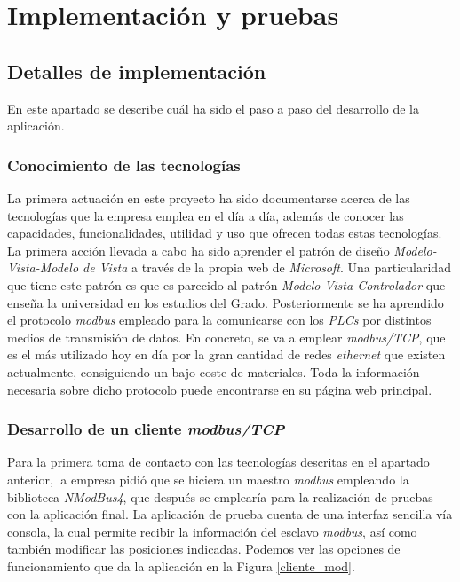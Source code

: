 \documentclass[pdftex,11pt,a4paper]{book}
\begin{document}

\chapter{Implementación y pruebas}

\section{Detalles de implementación}

En este apartado se describe cuál ha sido el paso a paso del desarrollo de la aplicación.

\subsection{Conocimiento de las tecnologías}

La primera actuación en este proyecto ha sido documentarse acerca de las tecnologías que la empresa emplea en el día a día, además de conocer las capacidades, funcionalidades, utilidad y uso que ofrecen todas estas tecnologías. La primera acción llevada a cabo ha sido aprender el patrón de diseño \emph{Modelo-Vista-Modelo de Vista} a través de la propia web de \emph{Microsoft}\cite{mvvm}. Una particularidad que tiene este patrón es que es parecido al patrón \emph{Modelo-Vista-Controlador} que enseña la universidad en los estudios del Grado. Posteriormente se ha aprendido el protocolo \emph{modbus} empleado para la comunicarse con los \emph{PLCs} por distintos medios de transmisión de datos. En concreto, se va a emplear \emph{modbus/TCP}, que es el más utilizado hoy en día por la gran cantidad de redes \emph{ethernet} que existen actualmente, consiguiendo un bajo coste de materiales. Toda la información necesaria sobre dicho protocolo puede encontrarse en su página web principal\cite{modbustcp}.

\subsection{Desarrollo de un cliente \emph{modbus/TCP}}

Para la primera toma de contacto con las tecnologías descritas en el apartado anterior, la empresa pidió que se hiciera un maestro \emph{modbus} empleando la biblioteca \emph{NModBus4}, que después se emplearía para la realización de pruebas con la aplicación final. La aplicación de prueba cuenta de una interfaz sencilla vía consola, la cual permite recibir la información del esclavo \emph{modbus}, así como también modificar las posiciones indicadas. Podemos ver las opciones de funcionamiento que da la aplicación en la Figura \ref{cliente_mod}.
\end{document}
